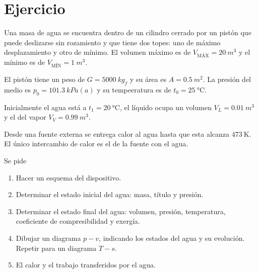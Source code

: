 \section{Ejercicio}\label{ej:Chap09Ejercicio09}

Una masa de agua se encuentra dentro de un cilindro cerrado por un pistón que puede deslizarse sin rozamiento y que tiene dos topes: uno de máximo desplazamiento y otro de mínimo. El volumen máximo es de $V_{\text{MÁX}}=\SI{20}{m^3}$ y el mínimo es de $V_{\text{MÍN}}=\SI{1}{m^3}$.

El pistón tiene un peso de $G=\SI{5000}{kg_f}$ y su área es $A=\SI{0.5}{m^2}$. La presión del medio es $p_0=\SI{101.3}{kPa(a)}$ y su tempeeratura es de $t_0=\SI{25}{\celsius}$.

Inicialmente el agua está a $t_1=\SI{20}{\celsius}$, el líquido ocupa un volumen $V_L=\SI{0.01}{m^3}$ y el del vapor $V_V=\SI{0.99}{m^3}$.

Desde una fuente externa se entrega calor al agua hasta que esta alcanza $\SI{473}{\kelvin}$. El único intercambio de calor es el de la fuente con el agua.

Se pide
\begin{enumerate}
    \item Hacer un esquema del dispositivo.
    \item Determinar el estado inicial del agua: masa, título y presión.
    \item Determinar el estado final del agua: volumen, presión, temperatura, coeficiente de compresibilidad y exergía.
    \item Dibujar un diagrama $p-v$, indicando los estados del agua y su evolución. Repetir para un diagrama $T-s$.
    \item El calor y el trabajo transferidos por el agua.
\end{enumerate}
